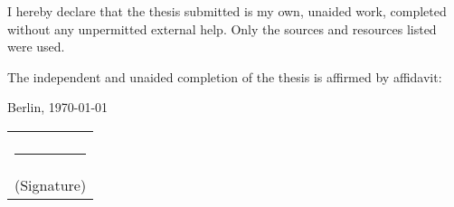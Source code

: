 
\thispagestyle{plain}

\hspace{0pt}
\vfill
\noindent
I  hereby  declare  that  the  thesis  submitted  is  my  own,  unaided  work,  completed  without  any 
unpermitted external help. Only the sources and resources listed were used.
\vspace{1cm}

\noindent
The independent and unaided completion of the thesis is affirmed by affidavit:

\noindent
Berlin, \today \hfill \begin{tabular}{c} \\ \\ \rule{5cm}{1pt} \\ (Signature)\end{tabular}
\vfill
\hspace{0pt}
\pagebreak